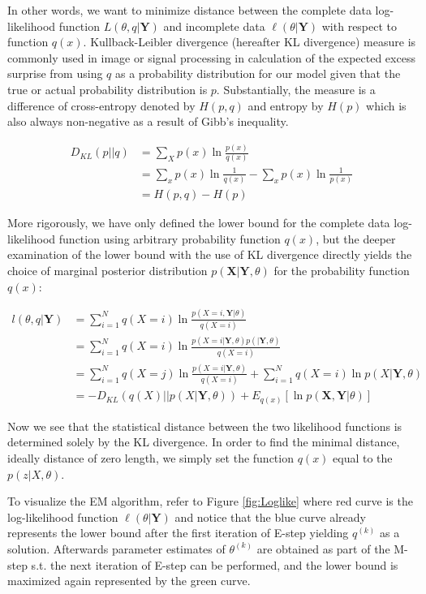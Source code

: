 In other words, we want to minimize distance between the complete data log-likelihood function $L(\theta,q|\textbf{Y})$ and incomplete data $\ell(\theta|\textbf{Y})$ 
with respect to function $q(x)$. Kullback-Leibler divergence (hereafter KL divergence) measure is commonly used in image or signal processing 
in calculation of the expected excess surprise from using $q$ as a probability distribution for our model given that the true or actual 
probability distribution is $p$. Substantially, the measure is a difference of cross-entropy denoted by $H(p,q)$ and entropy by $H(p)$ which 
is also always non-negative as a result of Gibb's inequality.

\begin{align}
D_{KL} (p || q) &= \sum_{X} p(x) \ln \frac{p(x)}{q(x)} \\
& = \sum_{x} p(x) \ln \frac{1}{q(x)} - \sum_{x} p(x) \ln \frac{1}{p(x)} \\
& = H(p,q) - H(p)
\end{align}

More rigorously, we have only defined the lower bound for the complete data log-likelihood function using arbitrary probability function $q(x)$, 
but the deeper examination of the lower bound with the use of KL divergence directly yields the choice of marginal posterior 
distribution $p(\textbf{X}|\textbf{Y},\theta)$ for the probability function $q(x)$:

\begin{align}
l(\theta,q|\textbf{Y}) &= \sum_{i=1}^{N} q(X = i) \ln \frac{p(X = i,\textbf{Y}|\theta)}{q(X = i)} \\
& = \sum_{i=1}^{N} q(X = i) \ln \frac{p(X = i|\textbf{Y},\theta) p(|\textbf{Y}, \theta)}{q(X = i)} \\
& = \sum_{i=1}^{N} q(X = j) \ln \frac{p(X = i|\textbf{Y},\theta)}{q(X = i)} + \sum_{i=1}^{N} q(X = i) \ln p(X|\textbf{Y},\theta)\\
& = -D_{KL}(q(X)||p(X|\textbf{Y},\theta)) + E_{q(x)} [\ln p(\textbf{X},\textbf{Y}|\theta)]
\end{align}

Now we see that the statistical distance between the two likelihood functions is determined solely by the KL divergence.
 In order to find the minimal distance, ideally distance of zero length, we simply set the function $q(x)$ equal to the $p(z|X,\theta)$.

To visualize the EM algorithm, refer to Figure \ref{fig:Loglike} where red curve is the log-likelihood function $\ell(\theta|\textbf{Y})$
and notice that the blue curve already represents the lower bound
after the first iteration of E-step yielding $q^{(k)}$ as a solution. Afterwards parameter estimates of $\theta^{(k)}$ are obtained as part of the M-step 
s.t. the next iteration of E-step can be performed, and the lower bound is maximized again represented by the green curve.


